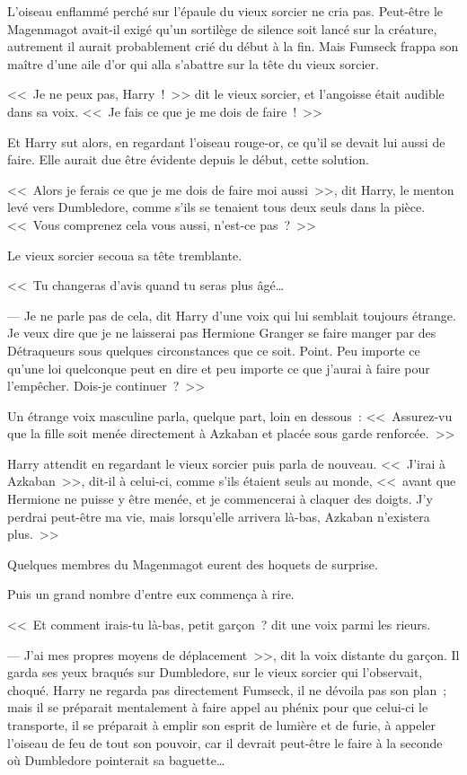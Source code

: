 L'oiseau enflammé perché sur l'épaule du vieux sorcier ne cria pas. Peut-être le Magenmagot avait-il exigé qu'un sortilège de silence soit lancé sur la créature, autrement il aurait probablement crié du début à la fin. Mais Fumseck frappa son maître d'une aile d'or qui alla s'abattre sur la tête du vieux sorcier.

<<~Je ne peux pas, Harry~!~>> dit le vieux sorcier, et l'angoisse était audible dans sa voix. <<~Je fais ce que je me dois de faire~!~>>

Et Harry sut alors, en regardant l'oiseau rouge-or, ce qu'il se devait lui aussi de faire. Elle aurait due être évidente depuis le début, cette solution.

<<~Alors je ferais ce que je me dois de faire moi aussi~>>, dit Harry, le menton levé vers Dumbledore, comme s'ils se tenaient tous deux seuls dans la pièce. <<~Vous comprenez cela vous aussi, n'est-ce pas~?~>>

Le vieux sorcier secoua sa tête tremblante.

<<~Tu changeras d'avis quand tu seras plus âgé…

--- Je ne parle pas de cela, dit Harry d'une voix qui lui semblait toujours étrange. Je veux dire que je ne laisserai pas Hermione Granger se faire manger par des Détraqueurs sous quelques circonstances que ce soit. Point. Peu importe ce qu'une loi quelconque peut en dire et peu importe ce que j'aurai à faire pour l'empêcher. Dois-je continuer~?~>>

Un étrange voix masculine parla, quelque part, loin en dessous~: <<~Assurez-vu que la fille soit menée directement à Azkaban et placée sous garde renforcée.~>>

Harry attendit en regardant le vieux sorcier puis parla de nouveau. <<~J'irai à Azkaban~>>, dit-il à celui-ci, comme s'ils étaient seuls au monde, <<~avant que Hermione ne puisse y être menée, et je commencerai à claquer des doigts. J'y perdrai peut-être ma vie, mais lorsqu'elle arrivera là-bas, Azkaban n'existera plus.~>>

Quelques membres du Magenmagot eurent des hoquets de surprise.

Puis un grand nombre d'entre eux commença à rire.

<<~Et comment irais-tu là-bas, petit garçon~? dit une voix parmi les rieurs.

--- J'ai mes propres moyens de déplacement~>>, dit la voix distante du garçon. Il garda ses yeux braqués sur Dumbledore, sur le vieux sorcier qui l'observait, choqué. Harry ne regarda pas directement Fumseck, il ne dévoila pas son plan~; mais il se préparait mentalement à faire appel au phénix pour que celui-ci le transporte, il se préparait à emplir son esprit de lumière et de furie, à appeler l'oiseau de feu de tout son pouvoir, car il devrait peut-être le faire à la seconde où Dumbledore pointerait sa baguette…

